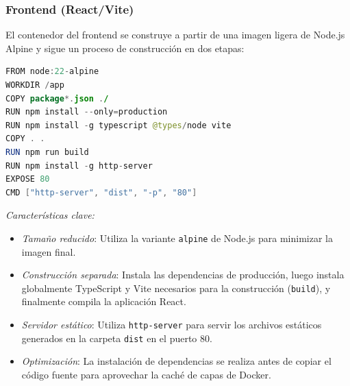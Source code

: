 \documentclass{article}
\begin{document}
\subsubsection{Frontend (React/Vite)}
El contenedor del frontend se construye a partir de una imagen ligera de Node.js Alpine y sigue un proceso de construcción en dos etapas:
\begin{lstlisting}[language=java, basicstyle=\small\ttfamily]
FROM node:22-alpine
WORKDIR /app
COPY package*.json ./
RUN npm install --only=production
RUN npm install -g typescript @types/node vite
COPY . .
RUN npm run build
RUN npm install -g http-server
EXPOSE 80
CMD ["http-server", "dist", "-p", "80"]
\end{lstlisting}
\textit{Características clave:}
\begin{itemize}
\item \textit{Tamaño reducido}: Utiliza la variante \texttt{alpine} de Node.js para minimizar la imagen final.
\item \textit{Construcción separada}: Instala las dependencias de producción, luego instala globalmente TypeScript y Vite necesarios para la construcción (\texttt{build}), y finalmente compila la aplicación React.
\item \textit{Servidor estático}: Utiliza \texttt{http-server} para servir los archivos estáticos generados en la carpeta \texttt{dist} en el puerto 80.
\item \textit{Optimización}: La instalación de dependencias se realiza antes de copiar el código fuente para aprovechar la caché de capas de Docker.
\end{itemize}
\end{document}
